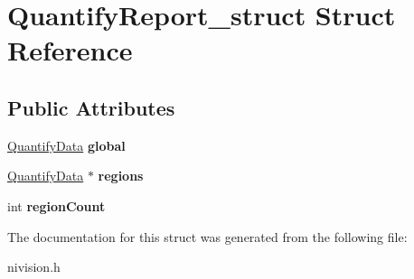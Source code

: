 \hypertarget{structQuantifyReport__struct}{\section{\-Quantify\-Report\-\_\-struct \-Struct \-Reference}
\label{structQuantifyReport__struct}
}
\subsection*{\-Public \-Attributes}
\begin{DoxyCompactItemize}
\item 
\hypertarget{structQuantifyReport__struct_ab9a92e5884d9b26def7c84a786bdfd84}{\hyperlink{structQuantifyData__struct}{\-Quantify\-Data} {\bfseries global}}\label{structQuantifyReport__struct_ab9a92e5884d9b26def7c84a786bdfd84}

\item 
\hypertarget{structQuantifyReport__struct_ac86450925ec96656fc37505ed8e6c43d}{\hyperlink{structQuantifyData__struct}{\-Quantify\-Data} $\ast$ {\bfseries regions}}\label{structQuantifyReport__struct_ac86450925ec96656fc37505ed8e6c43d}

\item 
\hypertarget{structQuantifyReport__struct_acf460a0a03c8728fa78ed9f21ff801e7}{int {\bfseries region\-Count}}\label{structQuantifyReport__struct_acf460a0a03c8728fa78ed9f21ff801e7}

\end{DoxyCompactItemize}


\-The documentation for this struct was generated from the following file\-:\begin{DoxyCompactItemize}
\item 
nivision.\-h\end{DoxyCompactItemize}
